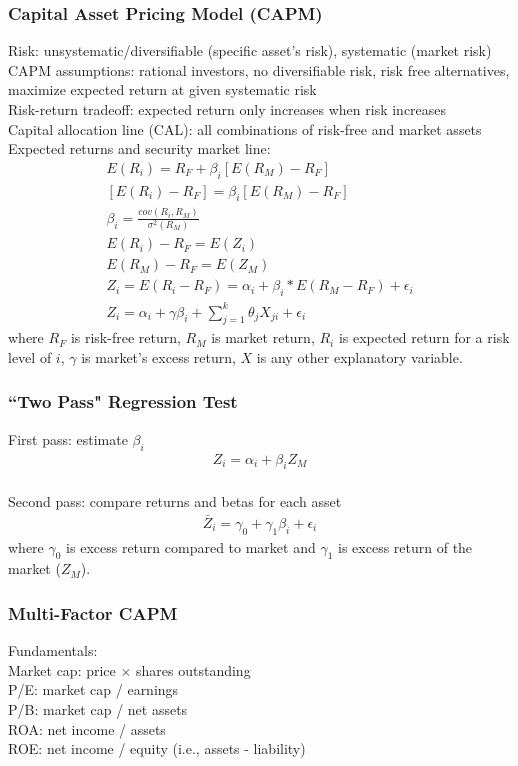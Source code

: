 \documentclass[12pt]{article}
\numberwithin{equation}{section}
\begin{document}
\subsubsection{Capital Asset Pricing Model (CAPM)}
Risk: unsystematic/diversifiable (specific asset's risk), systematic (market risk) \\[0.5cm]
CAPM assumptions: rational investors, no diversifiable risk, risk free alternatives, maximize expected return at given systematic risk \\[0.5cm]
Risk-return tradeoff: expected return only increases when risk increases \\[0.5cm]
Capital allocation line (CAL): all combinations of risk-free and market assets \\[0.5cm]
Expected returns and security market line:
\begin{gather}
    E(R_i) = R_F + \beta_i [E(R_M) - R_F] \\
    [E(R_i) - R_F] = \beta_i [E(R_M) - R_F] \\
    \beta_i = \frac{cov(R_i,R_M)}{\sigma^2(R_M)} \\
    E(R_i) - R_F = E(Z_i) \\
    E(R_M) - R_F = E(Z_M) \\
    Z_i = E(R_i - R_F) = \alpha_i + \beta_i * E(R_M - R_F) + \epsilon_i \\
    Z_i = \alpha_i + \gamma \beta_i + \sum_{j=1}^{k} \theta_j X_{ji} + \epsilon_i
\end{gather}
where $R_F$ is risk-free return, $R_M$ is market return, $R_i$ is expected return for a risk level of $i$, $\gamma$ is market's excess return, $X$ is any other explanatory variable.

\subsubsection{``Two Pass" Regression Test}
First pass: estimate $\beta_i$
\begin{gather}
    Z_i = \alpha_i + \beta_i Z_M
\end{gather} \\
Second pass: compare returns and betas for each asset
\begin{gather}
    \bar{Z}_i = \gamma_0 + \gamma_1 \beta_i + \epsilon_i
\end{gather}
where $\gamma_0$ is excess return compared to market and $\gamma_1$ is excess return of the market ($Z_M$).

\subsubsection{Multi-Factor CAPM}
Fundamentals: \\
Market cap: price $\times$ shares outstanding \\
P/E: market cap / earnings \\
P/B: market cap / net assets \\
ROA: net income / assets \\
ROE: net income / equity (i.e., assets - liability)
\end{document}

